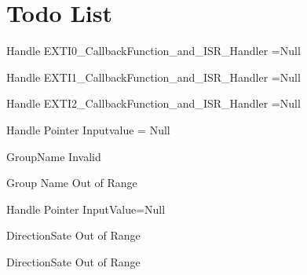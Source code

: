 \chapter{Todo List}
\hypertarget{todo}{}\label{todo}

\begin{DoxyRefList}
\item[Global \doxylink{EXTI__Program_8c_a63cfe47a79279085ee59b1644cf9ab60}{\+\_\+\+\_\+vector\+\_\+1} (void)]\label{todo__todo000024}%
%
Handle EXTI0\+\_\+\+Callback\+Function\+\_\+and\+\_\+\+ISR\+\_\+\+Handler =Null 
\item[Global \doxylink{EXTI__Program_8c_a6ae4ad8192e6928ac4f7e3e59001e53a}{\+\_\+\+\_\+vector\+\_\+2} (void)]\label{todo__todo000025}%
%
Handle EXTI1\+\_\+\+Callback\+Function\+\_\+and\+\_\+\+ISR\+\_\+\+Handler =Null 
\item[Global \doxylink{EXTI__Program_8c_a287f0e224ee5ed08a77ed629c1cf56b3}{\+\_\+\+\_\+vector\+\_\+3} (void)]\label{todo__todo000026}%
%
Handle EXTI2\+\_\+\+Callback\+Function\+\_\+and\+\_\+\+ISR\+\_\+\+Handler =Null 
\item[Global \doxylink{group__DIO_ga95187885f84f927b4f9d14a6978c4ecf}{m\+DIO\+\_\+\+Read\+Group} (uint8\+\_\+t Group\+Name, uint8\+\_\+t \texorpdfstring{$\ast$}{*}\+Input\+Value)]\label{todo__todo000017}%
%
Handle Pointer Inputvalue = Null 

\label{todo__todo000016}%
%
Group\+Name Invalid  
\item[Global \doxylink{group__DIO_gac9f91a2b92735825cc10024d11e0fb43}{m\+DIO\+\_\+\+Read\+Pin} (uint8\+\_\+t Group\+Name, uint8\+\_\+t Pin\+Number, uint8\+\_\+t \texorpdfstring{$\ast$}{*}\+Input\+Value)]\label{todo__todo000014}%
%
Group Name Out of Range 

\label{todo__todo000015}%
%
Handle Pointer Input\+Value=Null 
\item[Global \doxylink{group__DIO_gaa9024514a7b5ca9d235a3dedfbea3f49}{m\+DIO\+\_\+\+Set\+Direction\+For\+Group} (uint8\+\_\+t Group\+Name, uint8\+\_\+t Direction\+State)]\label{todo__todo000005}%
%
Direction\+Sate Out of Range 
\item[Global \doxylink{group__DIO_gaee82d215a64db9a7ea7b2f05dc992a31}{m\+DIO\+\_\+\+Set\+Direction\+For\+Pin} (uint8\+\_\+t Group\+Name, uint8\+\_\+t Pin\+Number, uint8\+\_\+t Direction\+State)]\label{todo__todo000002}%
%
Direction\+Sate Out of Range


\end{DoxyRefList}
